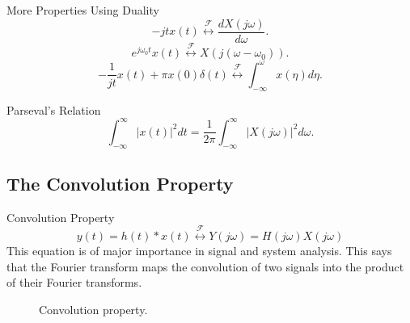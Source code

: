 \begin{frame}{More Properties Using Duality}
    \begin{equation*}
        -jtx(t) \overset{\mathcal{F}}{\longleftrightarrow} \frac{dX(j\omega)}{d\omega}.
    \end{equation*}
    \begin{equation*}
        e^{j\omega_0 t}x(t) \overset{\mathcal{F}}{\longleftrightarrow} X(j(\omega - \omega_0)).
    \end{equation*}
    \begin{equation*}
        -\frac{1}{jt}x(t) + \pi x(0) \delta(t) \overset{\mathcal{F}}{\longleftrightarrow} \int_{-\infty}^{\omega}x(\eta)d\eta.
    \end{equation*}
\end{frame}

\begin{frame}{Parseval's Relation}
    \begin{equation*}
        \int_{-\infty}^{\infty} |x(t)|^2dt = \frac{1}{2\pi} \int_{-\infty}^{\infty} |X(j\omega)|^2d\omega.
    \end{equation*}

\end{frame}


\subsection{The Convolution Property}

\begin{frame}{Convolution Property}
    \begin{equation*}
        y(t) = h(t)\ast x(t) \overset{\mathcal{F}}{\longleftrightarrow} Y(j\omega) =  H(j\omega)  X(j\omega)
    \end{equation*}
    This equation is of major importance in signal and system analysis. This says that the Fourier transform maps the convolution of two signals into the product of their Fourier transforms.
\end{frame}



\begin{frame}
    \begin{figure}
      \centering
      
      \caption{Convolution property.}\label{fi:conv_prop}
    \end{figure}

\end{frame}


